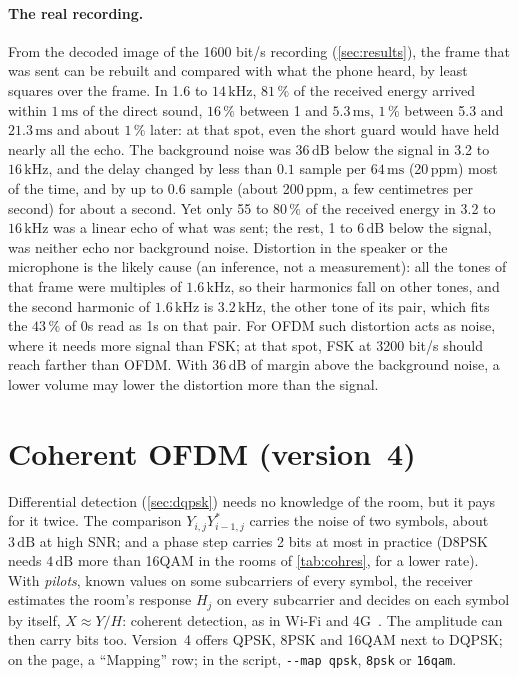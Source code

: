 \documentclass[11pt,a4paper]{article}
\newcommand{\kHz}{\,\mathrm{kHz}}
\newcommand{\ms}{\,\mathrm{ms}}
\newcommand{\dB}{\,\mathrm{dB}}
\newcommand{\code}[1]{\texttt{#1}}
\theoremstyle{remark}
\begin{document}
\paragraph{The real recording.}
From the decoded image of the 1600 bit/s recording (\cref{sec:results}), the frame that was sent can be rebuilt and compared with what the phone heard, by least squares over the frame. In 1.6 to $14\kHz$, $81\,\%$ of the received energy arrived within $1\ms$ of the direct sound, $16\,\%$ between 1 and $5.3\ms$, $1\,\%$ between 5.3 and $21.3\ms$ and about $1\,\%$ later: at that spot, even the short guard would have held nearly all the echo. The background noise was $36\dB$ below the signal in 3.2 to $16\kHz$, and the delay changed by less than $0.1$ sample per $64\ms$ (20\,ppm) most of the time, and by up to $0.6$ sample (about 200\,ppm, a few centimetres per second) for about a second. Yet only 55 to $80\,\%$ of the received energy in 3.2 to $16\kHz$ was a linear echo of what was sent; the rest, 1 to $6\dB$ below the signal, was neither echo nor background noise. Distortion in the speaker or the microphone is the likely cause (an inference, not a measurement): all the tones of that frame were multiples of $1.6\kHz$, so their harmonics fall on other tones, and the second harmonic of $1.6\kHz$ is $3.2\kHz$, the other tone of its pair, which fits the $43\,\%$ of 0s read as 1s on that pair. For OFDM such distortion acts as noise, where it needs more signal than FSK; at that spot, FSK at 3200 bit/s should reach farther than OFDM. With $36\dB$ of margin above the background noise, a lower volume may lower the distortion more than the signal.

\section{Coherent OFDM (version~4)}
\label{sec:coh}
Differential detection (\cref{sec:dqpsk}) needs no knowledge of the room, but it pays for it twice. The comparison $Y_{i,j} Y_{i-1,j}^*$ carries the noise of two symbols, about $3\dB$ at high SNR; and a phase step carries 2 bits at most in practice (D8PSK needs $4\dB$ more than 16QAM in the rooms of \cref{tab:cohres}, for a lower rate). With \emph{pilots}, known values on some subcarriers of every symbol, the receiver estimates the room's response $H_j$ on every subcarrier and decides on each symbol by itself, $X \approx Y/H$: coherent detection, as in Wi-Fi and 4G~\cite{ieee80211,ts36211}. The amplitude can then carry bits too. Version~4 offers QPSK, 8PSK and 16QAM next to DQPSK; on the page, a ``Mapping'' row; in the script, \code{-{}-map qpsk}, \code{8psk} or \code{16qam}.
\end{document}

